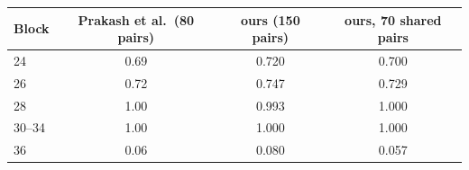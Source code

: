 \begin{tabular}{@{}lccc@{}}
\toprule
Block & Prakash et al.\ (80 pairs) & ours (150 pairs) & ours, 70 shared pairs \\
\midrule
24 & 0.69 & 0.720 & 0.700 \\
26 & 0.72 & 0.747 & 0.729 \\
28 & 1.00 & 0.993 & 1.000 \\
30--34 & 1.00 & 1.000 & 1.000 \\
36 & 0.06 & 0.080 & 0.057 \\
\bottomrule
\end{tabular}

